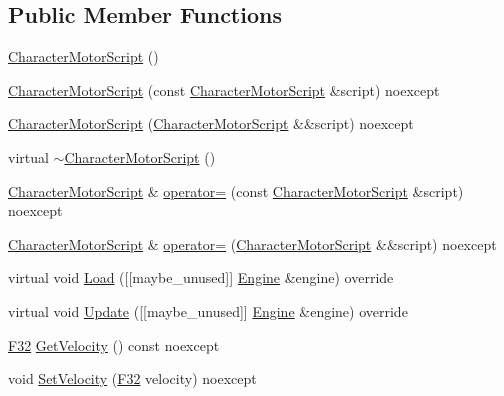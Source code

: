 \subsection*{Public Member Functions}
\begin{DoxyCompactItemize}
\item 
\mbox{\hyperlink{classmage_1_1script_1_1_character_motor_script_ac5147e7eca438fe01cc0bedb2ce0a750}{Character\+Motor\+Script}} ()
\item 
\mbox{\hyperlink{classmage_1_1script_1_1_character_motor_script_a22c2bc0693a38f12182234ba842aa6f2}{Character\+Motor\+Script}} (const \mbox{\hyperlink{classmage_1_1script_1_1_character_motor_script}{Character\+Motor\+Script}} \&script) noexcept
\item 
\mbox{\hyperlink{classmage_1_1script_1_1_character_motor_script_ad822459ba8d2bbd5a30d598c41c5a281}{Character\+Motor\+Script}} (\mbox{\hyperlink{classmage_1_1script_1_1_character_motor_script}{Character\+Motor\+Script}} \&\&script) noexcept
\item 
virtual \mbox{\hyperlink{classmage_1_1script_1_1_character_motor_script_a83ed3c2fcb60cef046499fd9c44f86ee}{$\sim$\+Character\+Motor\+Script}} ()
\item 
\mbox{\hyperlink{classmage_1_1script_1_1_character_motor_script}{Character\+Motor\+Script}} \& \mbox{\hyperlink{classmage_1_1script_1_1_character_motor_script_aec26db7e08e315cf2461e860b1eaee4e}{operator=}} (const \mbox{\hyperlink{classmage_1_1script_1_1_character_motor_script}{Character\+Motor\+Script}} \&script) noexcept
\item 
\mbox{\hyperlink{classmage_1_1script_1_1_character_motor_script}{Character\+Motor\+Script}} \& \mbox{\hyperlink{classmage_1_1script_1_1_character_motor_script_a284b9ecfd595278062cf3a16ebd90f43}{operator=}} (\mbox{\hyperlink{classmage_1_1script_1_1_character_motor_script}{Character\+Motor\+Script}} \&\&script) noexcept
\item 
virtual void \mbox{\hyperlink{classmage_1_1script_1_1_character_motor_script_a20699adf280bed4bfadd4a89d7df33c1}{Load}} (\mbox{[}\mbox{[}maybe\+\_\+unused\mbox{]}\mbox{]} \mbox{\hyperlink{classmage_1_1_engine}{Engine}} \&engine) override
\item 
virtual void \mbox{\hyperlink{classmage_1_1script_1_1_character_motor_script_ae738c9550e17be133291ccd2a6681368}{Update}} (\mbox{[}\mbox{[}maybe\+\_\+unused\mbox{]}\mbox{]} \mbox{\hyperlink{classmage_1_1_engine}{Engine}} \&engine) override
\item 
\mbox{\hyperlink{namespacemage_aa97e833b45f06d60a0a9c4fc22ae02c0}{F32}} \mbox{\hyperlink{classmage_1_1script_1_1_character_motor_script_a24edb3337af40e7326c424bc6b93c3fa}{Get\+Velocity}} () const noexcept
\item 
void \mbox{\hyperlink{classmage_1_1script_1_1_character_motor_script_a51c9b8317670fc0ae554bfb0cac11aee}{Set\+Velocity}} (\mbox{\hyperlink{namespacemage_aa97e833b45f06d60a0a9c4fc22ae02c0}{F32}} velocity) noexcept
\end{DoxyCompactItemize}
